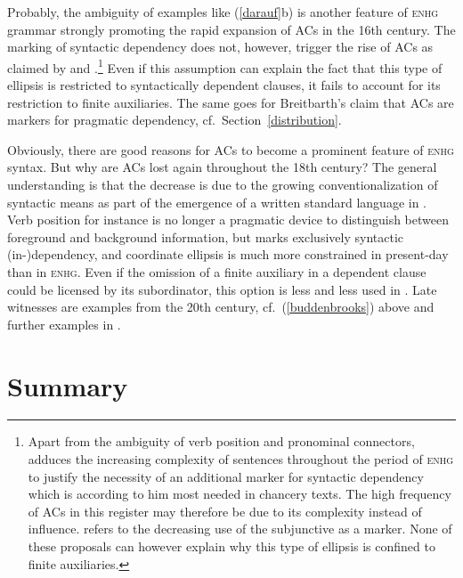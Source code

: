 \documentclass[output=paper,colorlinks,citecolor=brown]{langscibook}
\begin{document}
\largerpage
\noindent
Probably, the ambiguity of examples like (\ref{darauf}b) is another feature of \textsc{enhg} grammar strongly promoting the rapid expansion of ACs in the 16th century. The marking of syntactic dependency does not, however, trigger the rise of ACs as claimed by \citet{admoni67, breitbarth2005, demske90} and \citet{senyuk2014}.\footnote{Apart from the ambiguity of verb position and pronominal connectors, \citet{admoni67} adduces the increasing complexity of sentences throughout the period of \textsc{enhg} to justify the necessity of an additional marker for syntactic dependency which is according to him most needed in chancery texts. The high frequency of ACs in this register may therefore be due to its complexity instead of  influence. \citet{breitbarth2005} refers to the decreasing use of the subjunctive as a marker. None of these proposals can however explain why this type of ellipsis is confined to finite auxiliaries.} Even if this assumption can explain the fact that this type of ellipsis is restricted to syntactically dependent clauses, it fails to account for its restriction to finite auxiliaries. The same goes for Breitbarth's claim that ACs are markers for pragmatic dependency, cf.\ Section~\ref{distribution}.

Obviously, there are good reasons for ACs to become a prominent feature of \textsc{enhg} syntax. But why are ACs lost again throughout the 18th century? The general understanding is that the decrease is due to the growing conventionalization of syntactic means as part of the emergence of a written standard language in . Verb position for instance is no longer a pragmatic device to distinguish between foreground and background information, but marks exclusively syntactic (in-)dependency, and coordinate ellipsis is much more constrained in present-day  than in \textsc{enhg}. Even if the omission of a finite auxiliary in a dependent clause could be licensed by its subordinator, this option is less and less used in . Late witnesses are examples from the 20th century, cf.\ (\ref{buddenbrooks}) above and further examples in \citet[18]{blum2018}. 

\section{Summary} 
\end{document}
